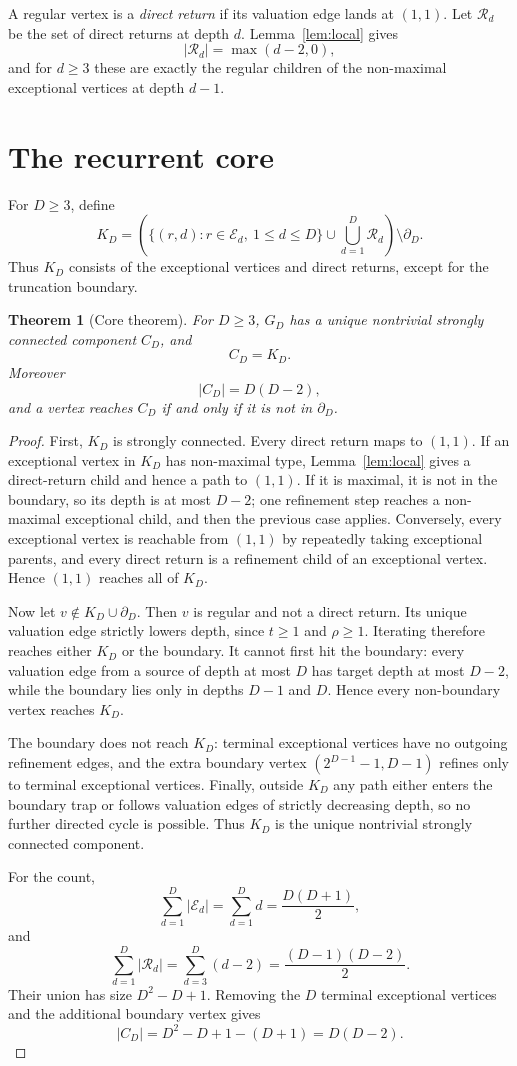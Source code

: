 \documentclass[11pt]{article}
\newtheorem{theorem}{Theorem}[section]
\theoremstyle{definition}
\theoremstyle{remark}
\newcommand{\Ecal}{\mathcal E}
\newcommand{\Rcal}{\mathcal R}
\newcommand{\bdD}{\partial_D}
\begin{document}
A regular vertex is a \emph{direct return} if its valuation edge lands at $(1,1)$.  Let $\Rcal_d$ be the set of direct returns at depth $d$.  Lemma~\ref{lem:local} gives
\[
|\Rcal_d|=\max(d-2,0),
\]
and for $d\ge3$ these are exactly the regular children of the non-maximal exceptional vertices at depth $d-1$.

\section{The recurrent core}\label{sec:core}

For $D\ge3$, define
\[
K_D=\left(\{(r,d):r\in\Ecal_d,\ 1\le d\le D\}\cup\bigcup_{d=1}^D\Rcal_d\right)\setminus\bdD.
\]
Thus $K_D$ consists of the exceptional vertices and direct returns, except for the truncation boundary.

\begin{theorem}[Core theorem]\label{thm:core}
For $D\ge3$, $G_D$ has a unique nontrivial strongly connected component $C_D$, and
\[
C_D=K_D.
\]
Moreover
\[
|C_D|=D(D-2),
\]
and a vertex reaches $C_D$ if and only if it is not in $\bdD$.
\end{theorem}

\begin{proof}
First, $K_D$ is strongly connected.  Every direct return maps to $(1,1)$.  If an exceptional vertex in $K_D$ has non-maximal type, Lemma~\ref{lem:local} gives a direct-return child and hence a path to $(1,1)$.  If it is maximal, it is not in the boundary, so its depth is at most $D-2$; one refinement step reaches a non-maximal exceptional child, and then the previous case applies.  Conversely, every exceptional vertex is reachable from $(1,1)$ by repeatedly taking exceptional parents, and every direct return is a refinement child of an exceptional vertex.  Hence $(1,1)$ reaches all of $K_D$.

Now let $v\notin K_D\cup\bdD$.  Then $v$ is regular and not a direct return.  Its unique valuation edge strictly lowers depth, since $t\ge1$ and $\rho\ge1$.  Iterating therefore reaches either $K_D$ or the boundary.  It cannot first hit the boundary: every valuation edge from a source of depth at most $D$ has target depth at most $D-2$, while the boundary lies only in depths $D-1$ and $D$.  Hence every non-boundary vertex reaches $K_D$.

The boundary does not reach $K_D$: terminal exceptional vertices have no outgoing refinement edges, and the extra boundary vertex $(2^{D-1}-1,D-1)$ refines only to terminal exceptional vertices.  Finally, outside $K_D$ any path either enters the boundary trap or follows valuation edges of strictly decreasing depth, so no further directed cycle is possible.  Thus $K_D$ is the unique nontrivial strongly connected component.

For the count,
\[
\sum_{d=1}^D |\Ecal_d|=\sum_{d=1}^D d=\frac{D(D+1)}2,
\]
and
\[
\sum_{d=1}^D |\Rcal_d|=\sum_{d=3}^D(d-2)=\frac{(D-1)(D-2)}2.
\]
Their union has size $D^2-D+1$.  Removing the $D$ terminal exceptional vertices and the additional boundary vertex gives
\[
|C_D|=D^2-D+1-(D+1)=D(D-2).
\]
\end{proof}
\end{document}
